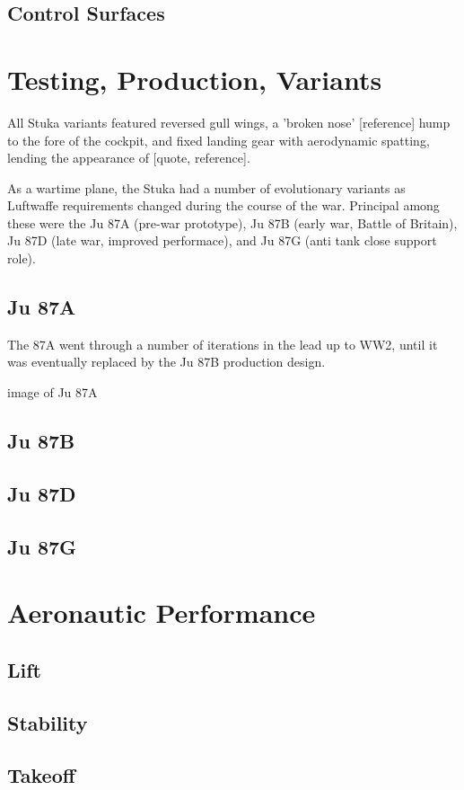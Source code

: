 \documentclass[a4paper, fontsize=11pt]{scrartcl} %
\begin{document}
\subsection{Control Surfaces}

\section{Testing, Production, Variants}
All Stuka variants featured reversed gull wings, a 'broken nose' [reference]
hump to the fore of the cockpit, and fixed landing gear with aerodynamic
spatting\autocite[p.~4]{curry88}, lending the
appearance of [quote, reference]. %

As a wartime plane, the Stuka had a number of evolutionary variants as
Luftwaffe requirements changed during the course of the war. Principal among these were the Ju 87A
(pre-war prototype), Ju 87B (early war, Battle of Britain), Ju 87D
(late war, improved performace), and Ju 87G (anti tank close support
role).
\subsection{Ju 87A}
The 87A went through a number of iterations in the lead up to WW2,
until it was eventually replaced by the Ju 87B production design. 

{image of Ju 87A}
\subsection{Ju 87B}
\subsection{Ju 87D}
\subsection{Ju 87G}
\section{Aeronautic Performance}
\subsection{Lift}
\subsection{Stability}
\subsection{Takeoff}
\end{document}
